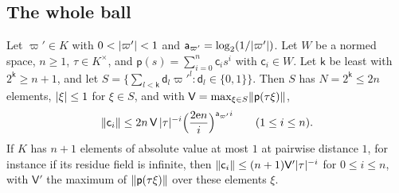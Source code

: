 \subsection{The whole ball}\label{dp:ssec:ball}

\begin{lemma}\label{dp:lem:node}
Let $\varpi'\in K$ with $0<\lvert \varpi'\rvert<1$ and $\mathsf a_{\varpi'}=\log_2(1/\lvert \varpi'\rvert)$. Let $W$ be a normed space, $n\ge1$, $\tau\in K^\times$, and $\mathsf p(s)=\sum_{i=0}^n\mathsf c_is^i$ with $\mathsf c_i\in W$. Let $\mathsf k$ be least with $2^{\mathsf k}\ge n+1$, and let $S=\{\sum_{l<\mathsf k}\mathsf d_l\varpi'^l:\mathsf d_l\in\{0,1\}\}$. Then $S$ has $N=2^{\mathsf k}\le2n$ elements, $\lvert \xi\rvert\le1$ for $\xi\in S$, and with $\mathsf V=\max_{\xi\in S}\lVert \mathsf p(\tau\xi)\rVert$,
\begin{equation}\label{dp:4a:eq:node}
 \lVert \mathsf c_i\rVert\le2n\,\mathsf V\,\lvert \tau\rvert^{-i}\Bigl(\frac{2\mathrm en}i\Bigr)^{\mathsf a_{\varpi'} i}\qquad(1\le i\le n).
\end{equation}
If $K$ has $n+1$ elements of absolute value at most $1$ at pairwise distance $1$, for instance if its residue field is infinite, then $\lVert \mathsf c_i\rVert\le(n+1)\mathsf V'\lvert \tau\rvert^{-i}$ for $0\le i\le n$, with $\mathsf V'$ the maximum of $\lVert \mathsf p(\tau\xi)\rVert$ over these elements $\xi$.
\end{lemma}


